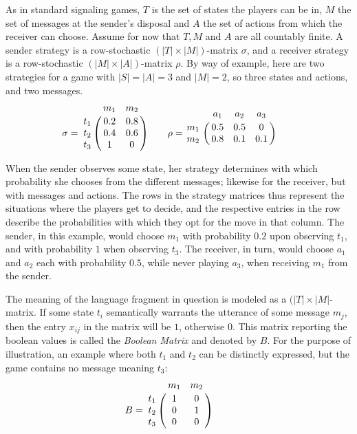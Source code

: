\documentclass[10]{article}
\begin{document}
As in standard signaling games, $T$ is the set of states the players can be in, $M$ the set of messages at the sender's disposal and $A$ the set of actions from which the receiver can choose. Assume for now that $T,M$ and $A$ are all countably finite. A sender strategy is a row-stochastic $(|T| \times |M|)$-matrix $\sigma$, and a receiver strategy is a row-stochastic $(|M|\times |A|)$-matrix $\rho$. By way of example, here are two strategies for a game with $|S|=|A|=3$ and $|M|=2$, so three states and actions, and two messages. \\
\begin{equation*}
\sigma =
    \bordermatrix{
          & m_1 & m_2    \cr
      t_1 & 0.2 & 0.8  \cr
      t_2 & 0.4 & 0.6  \cr
      t_3 & 1 & 0
    }\qquad
\rho =
    \bordermatrix{
              & a_1 & a_2 & a_3    \cr
          m_1 & 0.5 & 0.5 & 0  \cr
          m_2 & 0.8 & 0.1 & 0.1
        }\qquad
\end{equation*}

When the sender observes some state, her strategy determines with which probability she chooses from the different messages; likewise for the receiver, but with messages and actions. The rows in the strategy matrices thus represent the situations where the players get to decide, and the respective entries in the row describe the probabilities with which they opt for the move in that column. The sender, in this example, would choose $m_1$ with probability $0.2$ upon observing $t_1$, and with probability $1$ when observing $t_3$. The receiver, in turn, would choose $a_1$ and $a_2$ each with probability $0.5$, while never playing $a_3$, when receiving $m_1$ from the sender.

The meaning of the language fragment in question is modeled as a $(|T| \times |M|$-matrix. If some state $t_i$ semantically warrants the utterance of some message $m_j$, then the entry $x_{ij}$ in the matrix will be $1$, otherwise $0$. This matrix reporting the boolean values is called the \textit{Boolean Matrix} and denoted by $B$. For the purpose of illustration, an example where both $t_1$ and $t_2$ can be distinctly expressed, but the game contains no message meaning $t_3$:\\
\begin{equation*}
B =
    \bordermatrix{
              & m_1 & m_2    \cr
          t_1 & 1 & 0  \cr
          t_2 & 0 & 1  \cr
          t_3 & 0 & 0
        }\qquad
\end{equation*}
\end{document}
